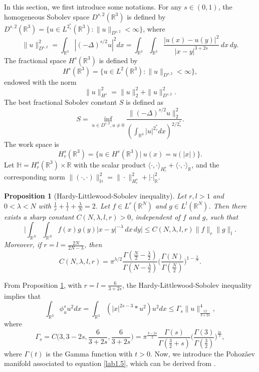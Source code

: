 \documentclass[11pt]{article}
\numberwithin{equation}{section}
\newtheorem{proposition}[theorem]{Proposition}
\begin{document}
In this section, we first introduce  some  notations. For any $s\in(0,1)$, the
homogeneous Sobolev space $D^{s,2}(\mathbb{R}^3)$ is defined by
$D^{s,2}(\mathbb{R}^3)=\{u\in L^{2^*_s}(\mathbb{R}^3):\|u\|_{D^{s,2}}<\infty\}$,
where
$$
\|u\|^2_{D^{s,2}}=\int_{\mathbb{R}^3}|(-\Delta)^{s/2}u|^2dx
=\int_{\mathbb{R}^3}\int_{\mathbb{R}^3}\frac{|u(x)-u(y)|^2}{|x-y|^{3+2s}}\,dx\,dy.
$$
The fractional space $H^s(\mathbb{R}^3)$ is defined by
$$
H^s(\mathbb{R}^3)=\{u\in L^2(\mathbb{R}^3): \|u\|_{D^{s,2}}< \infty \},
$$
endowed with the norm
$$
\|u\|^2_{H^s}=\|u\|^2_2+\|u\|^2_{D^{s,2}}.
$$
The best fractional Sobolev constant $S$ is defined as
\begin{equation}\label{2.111}
S=\inf_{u\in D^{s,2}, u\neq 0}
\frac{\|(-\Delta)^{s/2}u\|^2_2}
{(\int_{\mathbb{R}^3}|u|^{2^*_s}dx)^{2/2^*_s}}.
\end{equation}
The work space is
 $$
 H^s_r(\mathbb{R}^3)=\{u \in H^s(\mathbb{R}^3)|~ u(x)=u(|x|)\}.
 $$
Let $\mathbb{H}=H^s_r(\mathbb{R}^3) \times \mathbb{R}$ with the scalar product
$\langle\cdot, \cdot\rangle_{H^s_r}+\langle\cdot, \cdot\rangle_{\mathbb{R}}$, and
the corresponding norm
$\|(\cdot, \cdot)\|^2_\mathbb{H}=\|\cdot\|^2_{H^s_r}+|\cdot|^2_{\mathbb{R}}$.

\begin{proposition}[Hardy-Littlewood-Sobolev inequality] \label{pro2.1}
Let $r,l>1$ and $0<\lambda <N$ with $\frac{1}{r}+\frac{1}{l}+\frac{\lambda}{N}=2$.
Let $f\in L^r(\mathbb{R}^N)$ and $g\in L^l(\mathbb{R}^N)$.
Then there exists a sharp constant $C(N, \lambda, l, r)>0$, independent of $f$ and $g$,
such that
\[
\Big|\int_{\mathbb{R}^N}\int_{\mathbb{R}^N}f(x)g(y)|x-y|^{-\lambda}\,dx\,dy\Big|
\leq C(N, \lambda, l, r)\|f\|_{r}\|g\|_{l}.
\]
Moreover, if $r=l=\frac{2N}{2N-\lambda}$, then
\[
C(N, \lambda, l, r)
=\pi^{\lambda/2}\frac{\Gamma(\frac{N}{2}-\frac{\lambda}{2})}
{\Gamma(N-\frac{\lambda}{2})}\Big(\frac{\Gamma(N)}{\Gamma(\frac{N}{2})}
\Big)^{1-\frac{\lambda}{N}}.
\]
\end{proposition}

From Proposition \ref{pro2.1},  with  $r=l=\frac{6}{3+2s}$, the
 Hardy-Littlewood-Sobolev inequality implies that
\begin{equation}\label{3.3}
\int_{\mathbb{R}^3}\phi^s_u u^2dx=\int_{\mathbb{R}^3}
\left(|x|^{2s-3}\ast u^2\right)u^2dx\leq \Gamma_s\|u\|^4_{\frac{12}{3+2s}},
\end{equation}
where
\[
\Gamma_s=C\big(3, 3-2s, \frac{6}{3+2s}, \frac{6}{3+2s}\big)=\pi^{\frac{3-2s}{2}}
\frac{\Gamma(s)}{\Gamma(\frac{3}{2}+s)}\Big(\frac{\Gamma(3)}
{\Gamma(\frac{3}{2})}\Big)^{\frac{2s}{3}},
\]
where $\Gamma(t)$ is  the Gamma function with $t>0$.
Now, we introduce the Pohoz{\v{a}}ev manifold associated to equation  \eqref{lab1.5},
which can be derived from \cite{T7899}.
\end{document}
